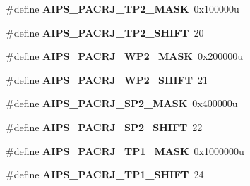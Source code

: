 \begin{DoxyCompactItemize}
\item 
\hypertarget{group___a_i_p_s___register___masks_gac450543f7cf9c70fa510fe14a4d9281f}{}\#define {\bfseries A\+I\+P\+S\+\_\+\+P\+A\+C\+R\+J\+\_\+\+T\+P2\+\_\+\+M\+A\+S\+K}~0x100000u\label{group___a_i_p_s___register___masks_gac450543f7cf9c70fa510fe14a4d9281f}

\item 
\hypertarget{group___a_i_p_s___register___masks_gaa333e64f1f89dd2a04eda478410f1e2f}{}\#define {\bfseries A\+I\+P\+S\+\_\+\+P\+A\+C\+R\+J\+\_\+\+T\+P2\+\_\+\+S\+H\+I\+F\+T}~20\label{group___a_i_p_s___register___masks_gaa333e64f1f89dd2a04eda478410f1e2f}

\item 
\hypertarget{group___a_i_p_s___register___masks_gaf8d56e51bb37bf9a355e9df5cb4f45b8}{}\#define {\bfseries A\+I\+P\+S\+\_\+\+P\+A\+C\+R\+J\+\_\+\+W\+P2\+\_\+\+M\+A\+S\+K}~0x200000u\label{group___a_i_p_s___register___masks_gaf8d56e51bb37bf9a355e9df5cb4f45b8}

\item 
\hypertarget{group___a_i_p_s___register___masks_ga292cf7ba35be9b4bba8f37fffe22b9ab}{}\#define {\bfseries A\+I\+P\+S\+\_\+\+P\+A\+C\+R\+J\+\_\+\+W\+P2\+\_\+\+S\+H\+I\+F\+T}~21\label{group___a_i_p_s___register___masks_ga292cf7ba35be9b4bba8f37fffe22b9ab}

\item 
\hypertarget{group___a_i_p_s___register___masks_ga7fc32443b5c444d0906620ee9f416e63}{}\#define {\bfseries A\+I\+P\+S\+\_\+\+P\+A\+C\+R\+J\+\_\+\+S\+P2\+\_\+\+M\+A\+S\+K}~0x400000u\label{group___a_i_p_s___register___masks_ga7fc32443b5c444d0906620ee9f416e63}

\item 
\hypertarget{group___a_i_p_s___register___masks_gadeec53186f683101a52f41a619299ef0}{}\#define {\bfseries A\+I\+P\+S\+\_\+\+P\+A\+C\+R\+J\+\_\+\+S\+P2\+\_\+\+S\+H\+I\+F\+T}~22\label{group___a_i_p_s___register___masks_gadeec53186f683101a52f41a619299ef0}

\item 
\hypertarget{group___a_i_p_s___register___masks_ga193a682c0aca79f08cd27f56bccd2e13}{}\#define {\bfseries A\+I\+P\+S\+\_\+\+P\+A\+C\+R\+J\+\_\+\+T\+P1\+\_\+\+M\+A\+S\+K}~0x1000000u\label{group___a_i_p_s___register___masks_ga193a682c0aca79f08cd27f56bccd2e13}

\item 
\hypertarget{group___a_i_p_s___register___masks_ga888db72e1839a2009974c88da81cc340}{}\#define {\bfseries A\+I\+P\+S\+\_\+\+P\+A\+C\+R\+J\+\_\+\+T\+P1\+\_\+\+S\+H\+I\+F\+T}~24\label{group___a_i_p_s___register___masks_ga888db72e1839a2009974c88da81cc340}


\end{DoxyCompactItemize}
